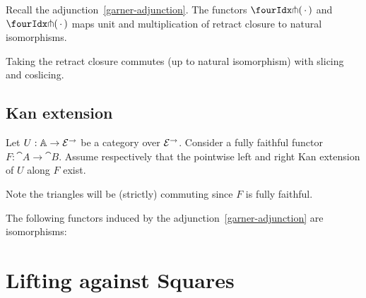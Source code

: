 \documentclass[reqno,10pt,a4paper,oneside]{amsart}
\begin{document}
\begin{lemma}
\label{retract-closure}
Recall the adjunction~\eqref{garner-adjunction}.
The functors $\liftr{\brarghole}$ and $\liftl{\brarghole}$ maps unit and multiplication of retract closure to natural isomorphisms.
\end{lemma}

\begin{remark}
\label{retract-closure-slicing}
Taking the retract closure commutes (up to natural isomorphism) with slicing and coslicing.
\end{remark}

\subsection{Kan extension}

Let $U : \mathbb{A} \to \mathcal{E}^{\to}$ be a category over $\mathcal{E}^{\to}$.
Consider a fully faithful functor $F : \cat{A} \to \cat{B}$.
Assume respectively that the pointwise left and right Kan extension of $U$ along $F$ exist.
Note the triangles will be (strictly) commuting since $F$ is fully faithful.

\begin{lemma}
\label{kan-extension-closure}
The following functors induced by the adjunction~\eqref{garner-adjunction} are isomorphisms:
\end{lemma}

\section{Lifting against Squares}
\end{document}
